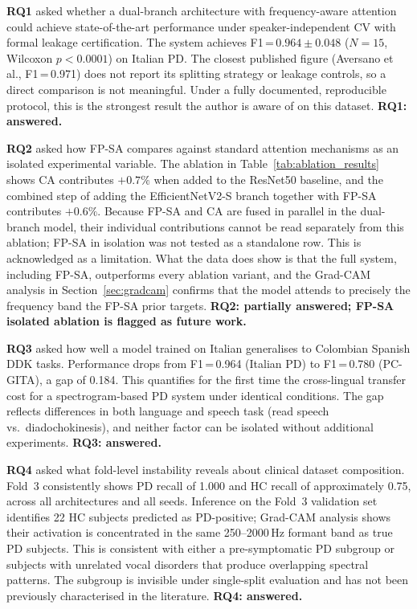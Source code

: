 \documentclass[oneside,openany]{final_report}
\begin{document}
\textbf{RQ1} asked whether a dual-branch architecture with frequency-aware attention could achieve state-of-the-art performance under speaker-independent CV with formal leakage certification. The system achieves F1\,=\,$0.964 \pm 0.048$ ($N\!=\!15$, Wilcoxon $p < 0.0001$) on Italian PD. The closest published figure (Aversano et al., F1\,=\,0.971) does not report its splitting strategy or leakage controls, so a direct comparison is not meaningful. Under a fully documented, reproducible protocol, this is the strongest result the author is aware of on this dataset. \textbf{RQ1: answered.}

\textbf{RQ2} asked how FP-SA compares against standard attention mechanisms as an isolated experimental variable. The ablation in Table~\ref{tab:ablation_results} shows CA contributes $+0.7\%$ when added to the ResNet50 baseline, and the combined step of adding the EfficientNetV2-S branch together with FP-SA contributes $+0.6\%$. Because FP-SA and CA are fused in parallel in the dual-branch model, their individual contributions cannot be read separately from this ablation; FP-SA in isolation was not tested as a standalone row. This is acknowledged as a limitation. What the data does show is that the full system, including FP-SA, outperforms every ablation variant, and the Grad-CAM analysis in Section~\ref{sec:gradcam} confirms that the model attends to precisely the frequency band the FP-SA prior targets. \textbf{RQ2: partially answered; FP-SA isolated ablation is flagged as future work.}

\textbf{RQ3} asked how well a model trained on Italian generalises to Colombian Spanish DDK tasks. Performance drops from F1\,=\,0.964 (Italian PD) to F1\,=\,0.780 (PC-GITA), a gap of 0.184. This quantifies for the first time the cross-lingual transfer cost for a spectrogram-based PD system under identical conditions. The gap reflects differences in both language and speech task (read speech vs.\ diadochokinesis), and neither factor can be isolated without additional experiments. \textbf{RQ3: answered.}

\textbf{RQ4} asked what fold-level instability reveals about clinical dataset composition. Fold~3 consistently shows PD recall of 1.000 and HC recall of approximately 0.75, across all architectures and all seeds. Inference on the Fold~3 validation set identifies 22 HC subjects predicted as PD-positive; Grad-CAM analysis shows their activation is concentrated in the same 250--2000\,Hz formant band as true PD subjects. This is consistent with either a pre-symptomatic PD subgroup or subjects with unrelated vocal disorders that produce overlapping spectral patterns. The subgroup is invisible under single-split evaluation and has not been previously characterised in the literature. \textbf{RQ4: answered.}
\end{document}
